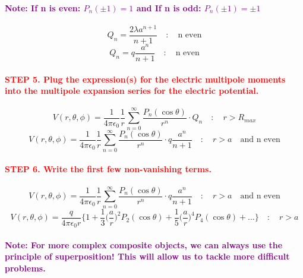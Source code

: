 \documentclass{article}
\begin{document}
\paragraph{\textcolor{purple}{Note: If n is even: $P_n(\pm 1)=1$ and If n is odd: $P_n(\pm 1)=\pm 1$}}
\begin{equation*}
    Q_n=\frac{2\lambda a^{n+1}}{n+1}\quad:\quad \text{n even}
\end{equation*}
\begin{equation*}
    Q_n=q\frac{a^n}{n+1}\quad:\quad \text{n even}
\end{equation*}
\paragraph{\textcolor{red}{STEP 5. Plug the expression(s) for the electric multipole moments into the multipole expansion series for the electric potential.}}
\begin{equation*}
    V(r,\theta,\phi)=\frac{1}{4\pi\epsilon_0}\frac{1}{r}\sum_{n=0}^{\infty} \frac{P_n(\cos\theta)}{r^n}\cdot Q_n \quad :\quad r>R_{max}
\end{equation*}
\begin{equation*}
    V(r,\theta,\phi)=\frac{1}{4\pi\epsilon_0}\frac{1}{r}\sum_{n=0}^{\infty} \frac{P_n(\cos\theta)}{r^n}\cdot q\frac{a^n}{n+1} \quad :\quad r>a \quad\text{and n even}
\end{equation*}
\paragraph{\textcolor{red}{STEP 6. Write the first few non-vanishing terms.}}
\begin{equation*}
    V(r,\theta,\phi)=\frac{1}{4\pi\epsilon_0}\frac{1}{r}\sum_{n=0}^{\infty} \frac{P_n(\cos\theta)}{r^n}\cdot q\frac{a^n}{n+1} \quad :\quad r>a \quad\text{and n even}
\end{equation*}
\begin{equation*}
    V(r,\theta,\phi)=\frac{q}{4\pi\epsilon_0 r}\bigg\{ 1+\frac{1}{3}\bigg(\frac{a}{r}\bigg)^2P_2(\cos\theta)+\frac{1}{5}\bigg(\frac{a}{r}\bigg)^4P_4(\cos\theta)+\dots\bigg\} \quad:\quad r>a
\end{equation*}
\paragraph{\textcolor{purple}{Note: For more complex composite objects, we can always use the principle of superposition! This will allow us to tackle more difficult problems. }}
\end{document}
